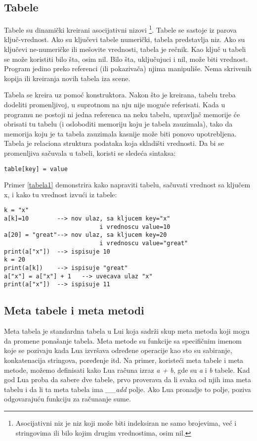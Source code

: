 \documentclass[a4paper]{article}
\begin{document}
\subsection{Tabele}
\label{sec:tabele}


Tabele su dinamički kreirani asocijativni nizovi \footnote{Asocijativni niz je niz koji može biti indeksiran ne samo brojevima, već i stringovima ili bilo kojim drugim vrednostima, osim nil.}. Tabele se sastoje iz parova ključ-vrednost. Ako su ključevi tabele numerički, tabela predstavlja niz. Ako su ključevi ne-numeričke ili mešovite vrednosti, tabela je rečnik. Kao ključ u tabeli se može koristiti bilo šta, osim nil. Bilo šta, uključujuci i nil, može biti vrednost.
Program jedino preko referenci (ili pokazivača) njima manipuliše. Nema skrivenih kopija ili kreiranja novih tabela iza scene.

Tabela se kreira uz pomoć konstruktora. Nakon što je kreirana, tabelu treba dodeliti promenljivoj, u suprotnom na nju nije moguće referisati. Kada u programu ne postoji ni jedna referenca na neku tabelu, upravljač memorije će obrisati tu tabelu (i osloboditi memoriju koju je tabela zauzimala), tako da memorija koju je ta tabela zauzimala kasnije može biti ponovo upotrebljena. Tabela je relaciona struktura podataka koja skladišti vrednosti. Da bi se promenljiva sačuvala u tabeli, koristi se sledeća sintaksa:
\begin{verbatim}
table[key] = value
\end{verbatim}
Primer \ref{tabela1} demonstrira kako napraviti tabelu, sačuvati vrednost sa ključem x, i kako tu vrednost izvući iz tabele: %
\begin{lstlisting}[caption={Primer čuvanja vrednosti u tabeli},frame=single, label=tabela1]
k = "x"
a[k]=10        --> nov ulaz, sa kljucem key="x" 
                           i vrednoscu value=10
a[20] = "great"--> nov ulaz, sa kljucem key=20 
                           i vrednoscu value="great"
print(a["x"])  --> ispisuje 10
k = 20
print(a[k])    --> ispisuje "great"
a["x"] = a["x"] + 1   --> uvecava ulaz "x"
print(a["x"])  --> ispisuje 11
\end{lstlisting}


\subsection*{Meta tabele i meta metodi}
Meta tabela je standardna tabela u Lui koja sadrži skup meta metoda koji mogu da promene ponašanje tabela. Meta metode su funkcije sa specifičnim imenom koje se pozivaju kada Lua izvršava određene operacije kao sto su sabiranje, konkatenacija stringova, poređenje itd. Na primer, koristeći meta tabele i meta metode, možemo definisati kako Lua računa izraz \textit{a + b}, gde su \textit{a} i \textit{b} tabele. Kad god Lua proba da sabere dve tabele, prvo proverava da li svaka od njih ima meta tabelu i da li ta meta tabela ima \textit{\_\_add} polje. Ako Lua pronadje to polje, poziva odgovarajuću funkciju za računanje sume.
\end{document}
